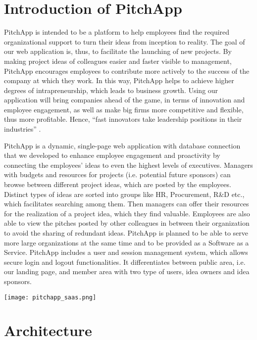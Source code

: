 \chapter{Introduction of PitchApp}

PitchApp is intended to be a platform to help employees find the required organizational support to turn their ideas from inception to reality. The goal of our web application is, thus, to facilitate the launching of new projects. By making project ideas of colleagues easier and faster visible to management, PitchApp encourages employees to contribute more actively to the success of the company at which they work. In this way, PitchApp helps to achieve higher degrees of intrapreneurship, which leads to business growth. Using our application will bring companies ahead of the game, in terms of innovation and
employee engagement, as well as make big firms more competitive and flexible, thus more
profitable. Hence, “fast innovators take leadership positions in their industries” \parencite{SH90}.

PitchApp is a dynamic, single-page web application with database connection that we developed to enhance employee engagement and proactivity by connecting the employees’ ideas to even the highest levels of executives. Managers with budgets and resources for projects (i.e. potential future sponsors) can browse between different project ideas, which are posted by the employees. Distinct types of ideas are sorted into groups like HR, Procurement, R\&D etc., which facilitates searching among them. Then managers can offer their resources for the realization of a project idea, which they find valuable. Employees are also able to view the pitches posted by other colleagues in between their organization to avoid the sharing of redundant ideas. PitchApp is planned to be able to serve more large organizations at the same time and to be provided as a Software as a Service. PitchApp includes a user and session management system, which allows secure login and logout functionalities. It differentiates between public area, i.e. our landing page, and member area with two type of users, idea owners and idea sponsors.

\texttt{[image: pitchapp\_saas.png]}



\chapter{Architecture}
